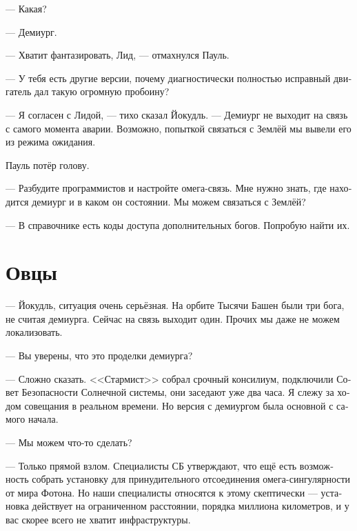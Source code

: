 \documentclass[a4paper,12pt,fleqn]{book}\usepackage{polyglossia}\setdefaultlanguage[babelshorthands=true]{russian}\setotherlanguage{english}\defaultfontfeatures{Ligatures=TeX,Mapping=tex-text}\usepackage{xcolor}\newcommand{\ml}[3]{#2}
\begin{document}
--- Какая?

--- Демиург.

--- Хватит фантазировать, Лид, --- отмахнулся Пауль.

--- У тебя есть другие версии, почему диагностически полностью исправный двигатель дал такую огромную пробоину?

--- Я согласен с Лидой, --- тихо сказал Йокудль.
--- Демиург не выходит на связь с самого момента аварии.
Возможно, попыткой связаться с Землёй мы вывели его из режима ожидания.

Пауль потёр голову.

--- Разбудите программистов и настройте омега-связь.
Мне нужно знать, где находится демиург и в каком он состоянии.
Мы можем связаться с Землёй?

--- В справочнике есть коды доступа дополнительных богов.
Попробую найти их.

\section{Овцы}

--- Йокудль, ситуация очень серьёзная.
На орбите Тысячи Башен были три бога, не считая демиурга.
\ml{$0$}
{Сейчас на связь выходит один.}
{Now we can contact only one of them.}
\ml{$0$}
{Прочих мы даже не можем локализовать.}
{The others we can't even locate.''}

\ml{$0$}
{--- Вы уверены, что это проделки демиурга?}
{``Are you sure the demiurge has something to do with that?''}

\ml{$0$}
{--- Сложно сказать.}
{``We're not.}
\ml{$0$}
{<<Стармист>> собрал срочный консилиум, подключили Совет Безопасности Солнечной системы, они заседают уже два часа.}
{\textsc{Starmist} has summoned an emergency meeting, even Solar Security Council are invited, they've been in session for nearly two hours now.}
\ml{$0$}
{Я слежу за ходом совещания в реальном времени.}
{I'm following all proceedings of the meeting in real time.}
\ml{$0$}
{Но версия с демиургом была основной с самого начала.}
{But interference of the demiurge was our best guess from the beginning.''}

\ml{$0$}
{--- Мы можем что-то сделать?}
{``What can we do?''}

\ml{$0$}
{--- Только прямой взлом.}
{``Your only option is to hack that thing.}
\ml{$0$}
{Специалисты СБ утверждают, что ещё есть возможность собрать установку для принудительного отсоединения омега-сингулярности от мира Фотона.}
{SSC specialists say that you have the opportunity to assembly a machine which can sever the connection between omega singularity and Photon Universe.}
\ml{$0$}
{Но наши специалисты относятся к этому скептически --- установка действует на ограниченном расстоянии, порядка миллиона километров, и у вас скорее всего не хватит инфраструктуры.}
{But our specialists are skeptical, because the machine has limited range, about one million kilometers, and most likely your infrastructure is insufficient.''}
\end{document}
